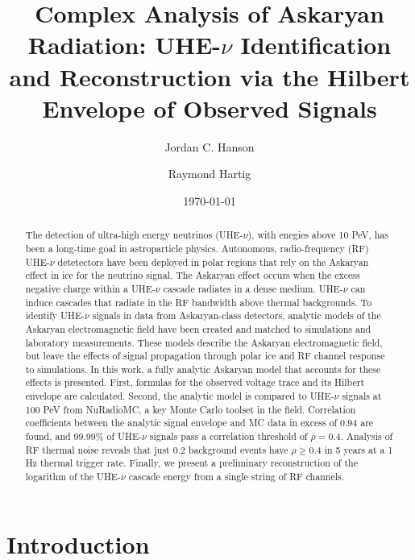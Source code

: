 \documentclass[amsmath,amssymb,aps,prd,10pt,twocolumn,showkeys]{revtex4}
\begin{document}
\title{Complex Analysis of Askaryan Radiation: UHE-$\nu$ Identification and Reconstruction via the Hilbert Envelope of Observed Signals}

\author{Jordan C. Hanson}
\author{Raymond Hartig}
\date{\today}

\begin{abstract}
The detection of ultra-high energy neutrinos (UHE-$\nu$), with enegies above 10 PeV, has been a long-time goal in astroparticle physics.  Autonomous, radio-frequency (RF) UHE-$\nu$ detetectors have been deployed in polar regions that rely on the Askaryan effect in ice for the neutrino signal.  The Askaryan effect occurs when the excess negative charge within a UHE-$\nu$ cascade radiates in a dense medium.  UHE-$\nu$ can induce cascades that radiate in the RF bandwidth above thermal backgrounds.  To identify UHE-$\nu$ signals in data from Askaryan-class detectors, analytic models of the Askaryan electromagnetic field have been created and matched to simulations and laboratory measurements.  These models describe the Askaryan electromagnetic field, but leave the effects of signal propagation through polar ice and RF channel response to simulations.  In this work, a fully analytic Askaryan model that accounts for these effects is presented.  First, formulas for the observed voltage trace and its Hilbert envelope are calculated.  Second, the analytic model is compared to UHE-$\nu$ signals at 100 PeV from NuRadioMC, a key Monte Carlo toolset in the field.  Correlation coefficients between the analytic signal envelope and MC data in excess of $0.94$ are found, and 99.99\% of UHE-$\nu$ signals pass a correlation threshold of $\rho=0.4$.  Analysis of RF thermal noise reveals that just 0.2 background events have $\rho\geq 0.4$ in 5 years at a 1 Hz thermal trigger rate.  Finally, we present a preliminary reconstruction of the logarithm of the UHE-$\nu$ cascade energy from a single string of RF channels.
\end{abstract}


\maketitle

\section{Introduction}
\label{sec:int}
\end{document}
